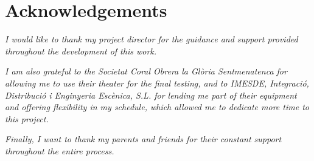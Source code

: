 


\vfill
\section*{Acknowledgements}

\textit{I would like to thank my project director for the guidance and support provided throughout the development of this work.}

\textit{I am also grateful to the Societat Coral Obrera la Glòria Sentmenatenca for allowing me to use their theater for the final testing, and to IMESDE, Integració, Distribució i Enginyeria Escènica, S.L. for lending me part of their equipment and offering flexibility in my schedule, which allowed me to dedicate more time to this project.}

\textit{Finally, I want to thank my parents and friends for their constant support throughout the entire process.}


